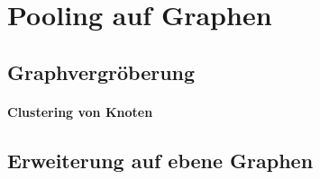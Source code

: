\section{Pooling auf Graphen}
\label{pooling}

\subsection{Graphvergröberung}
\label{graphvergroeberung}

\paragraph{Clustering von Knoten}
\label{clustering_von_knoten}

\subsection{Erweiterung auf ebene Graphen}
\label{pooling_erweiterung}
